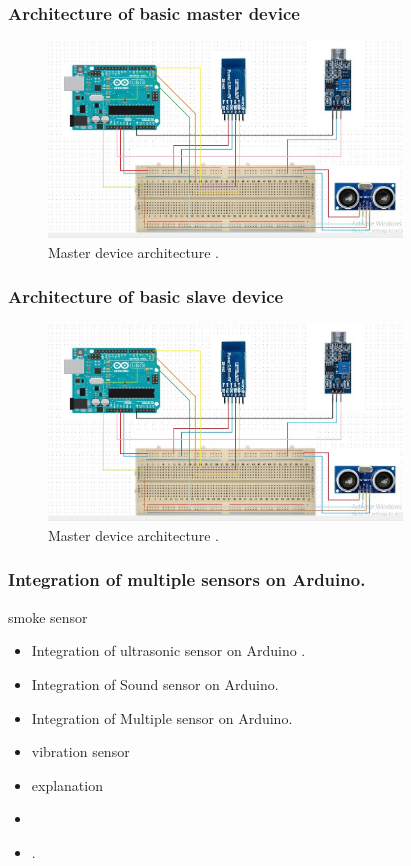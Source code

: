 \documentclass{beamer}
\begin{document}
\begin{frame}\frametitle{ Architecture of basic master device }
\begin{figure}[h]
\centerline{\includegraphics[width=3.7in]{master}}
\caption{Master device architecture  .}
\end{figure}
\end{frame}
\begin{frame}\frametitle{Architecture of basic slave device }
\begin{itemize}
\begin{figure}[h]
\centerline{\includegraphics[width=3.7in]{master}}
\caption{Master device architecture  .}
\end{figure}
\end{itemize}
\end{frame}
  \begin{frame}\frametitle{Integration of multiple sensors on Arduino.}
 \item smoke  sensor
\begin{itemize}
\item Integration of ultrasonic sensor on Arduino .
\item Integration of Sound sensor on Arduino.
\item Integration of Multiple sensor on Arduino.
\item vibration sensor
\item explanation
\item 
\item
.

\end{itemize}
\end{frame}
\end{document}
